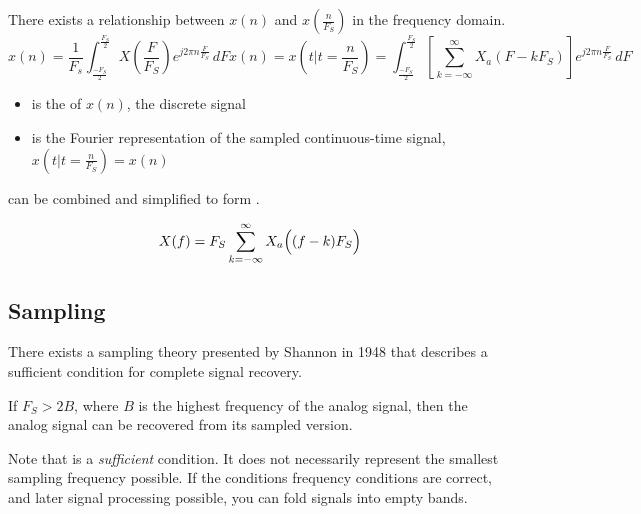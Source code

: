 There exists a relationship between $x(n)$ and $x\left( \frac{n}{F_{S}} \right)$ in the frequency domain.
\begin{subequations}
  \begin{equation}\label{eq:DTFT_of_xn}
    x(n) = \frac{1}{F_{s}} \int_{\frac{-F_{S}}{2}}^{\frac{F_{S}}{2}} X\left( \frac{F}{F_{S}} \right) e^{j 2\pi n \frac{F}{F_{S}}} \, dF
  \end{equation}
  \begin{equation}\label{eq:Fourier_Representation_of_Sampled_xt}
    x(n) = x(t \vert t = \frac{n}{F_{S}}) = \int_{\frac{-F_{S}}{2}}^{\frac{F_{S}}{2}} \left[ \sum\limits_{k=-\infty}^{\infty} X_{a}(F-kF_{S}) \right] e^{j 2\pi n \frac{F}{F_{S}}} \, dF
  \end{equation}
\end{subequations}
\begin{itemize}[noitemsep]
\item {} is the  of $x(n)$, the discrete signal
\item {} is the Fourier representation of the sampled continuous-time signal, $x(t \vert t = \frac{n}{F_{S}}) = x(n)$
\end{itemize}

 can be combined and simplified to form .

\begin{equation}\label{eq:Optimally_Sampled_Signal}
  X(f) = F_{S} \sum\limits_{k=-\infty}^{\infty} X_{a}\Bigl( (f-k) F_{S} \Bigr)
\end{equation}

\subsection{Sampling}\label{subsec:Sampling}
There exists a sampling theory presented by Shannon in 1948 that describes a sufficient condition for complete signal recovery.

\begin{theorem}\label{thm:Shannon_Sampling_Theorem}
  If $F_{S} > 2B$, where $B$ is the highest frequency of the analog signal, then the analog signal can be recovered from its sampled version.
\end{theorem}

\begin{remark*}
  Note that  is a \emph{sufficient} condition.
  It does not necessarily represent the smallest sampling frequency possible.
  If the conditions frequency conditions are correct, and later signal processing possible, you can fold signals into empty bands.
\end{remark*}

